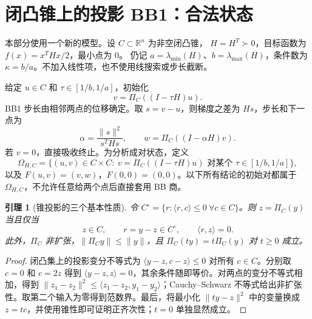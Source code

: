\documentclass[11pt,a4paper,UTF8,fontset=fandol]{ctexart}
\newtheorem{lemma}[theorem]{引理}
\theoremstyle{remark}\newtheorem{remark}[theorem]{说明}
\newcommand{\R}{\mathbb R}
\newcommand{\ip}[2]{\langle #1,#2\rangle}
\newcommand{\norm}[1]{\lVert #1\rVert}
\begin{document}
\section{闭凸锥上的投影 BB1：合法状态}
本部分使用一个新的模型。设 $C\subset\R^n$ 为非空闭凸锥，
$H=H^T\succ0$，目标函数为 $f(x)=x^THx/2$，最小点为 $0$。
仍记 $a=\lambda_{\min}(H)$、$b=\lambda_{\max}(H)$，条件数为
$\kappa=b/a$。不加入线性项，也不使用线搜索或步长截断。

给定 $u\in C$ 和 $\tau\in[1/b,1/a]$，初始化
\[
 v=\Pi_C((I-\tau H)u).
\]
BB1 步长由相邻两点的位移确定。取 \(s=v-u\)，则梯度之差为 \(Hs\)，步长和下一点为
\begin{equation}\label{eq:bb}
 \alpha=\frac{\norm{s}^2}{s^THs},\qquad
 w=\Pi_C((I-\alpha H)v).
\end{equation}
若 $v=0$，直接吸收终止。为分析成对状态，定义
\begin{equation}\label{eq:compatible}
 \Omega_{H,C}=\{(u,v)\in C\times C:\
 v=\Pi_C((I-\tau H)u)\text{ 对某个 }\tau\in[1/b,1/a]\},
\end{equation}
以及 $F(u,v)=(v,w)$，$F(0,0)=(0,0)$。以下所有结论的初始对都属于
$\Omega_{H,C}$，不允许任意给两个点后直接套用 BB 商。

\begin{lemma}[锥投影的三个基本性质]\label{lem:projection}
令 $C^\circ=\{r:\ip{r}{c}\le0\ \forall c\in C\}$。则
$z=\Pi_C(y)$ 当且仅当
\[
 z\in C,\qquad r=y-z\in C^\circ,\qquad \ip{r}{z}=0.
\]
此外，$\Pi_C$ 非扩张，$\norm{\Pi_C y}\le\norm y$，且
$\Pi_C(ty)=t\Pi_C(y)$ 对 $t\ge0$ 成立。
\end{lemma}
\begin{proof}
闭凸集上的投影变分不等式为
$\ip{y-z}{c-z}\le0$ 对所有 $c\in C$。分别取 $c=0$ 和 $c=2z$ 得到
$\ip{y-z}{z}=0$，其余条件随即等价。对两点的变分不等式相加，得到
$\norm{z_1-z_2}^2\le\ip{z_1-z_2}{y_1-y_2}$；Cauchy--Schwarz 不等式给出非扩张性。取第二个输入为零得到范数界。最后，将最小化
$\norm{ty-z}^2$ 中的变量换成 $z=tc$，并使用锥性即可证明正齐次性；$t=0$ 单独显然成立。
\end{proof}
\end{document}

